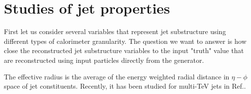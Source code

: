 \section{Studies of jet properties}
\label{sec:jets}

First let us consider several variables that represent jet substructure using different types
of calorimeter granularity. The question we want to answer is how close the reconstructed
jet substructure variables to the input "truth" value that are reconstructed using 
input particles directly from the \pythia generator.


The effective radius is the average of the energy weighted radial distance in $\eta-\phi$ space of jet constituents.
Recently, it has been studied for multi-TeV jets in Ref.\cite{Auerbach:2014xua}.
 

\begin{figure}
\begin{center}
\end{center}
\end{figure}
